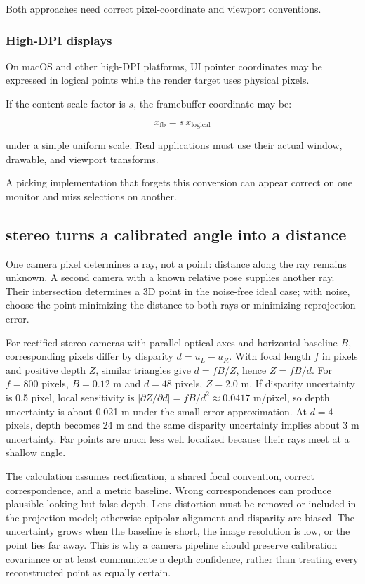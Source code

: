 Both approaches need correct pixel-coordinate and viewport conventions.

\subsubsection{High-DPI displays}\label{high-dpi-displays}

On macOS and other high-DPI platforms, UI pointer coordinates may be expressed in logical points while the render target uses physical pixels.

If the content scale factor is \(s\), the framebuffer coordinate may be:

\[ x_{\mathrm{fb}}=s\,x_{\mathrm{logical}} \]

under a simple uniform scale. Real applications must use their actual window, drawable, and viewport transforms.

A picking implementation that forgets this conversion can appear correct on one monitor and miss selections on another.

\subsection{stereo turns a calibrated angle into a distance}\label{stereo-turns-a-calibrated-angle-into-a-distance}

One camera pixel determines a ray, not a point: distance along the ray remains unknown. A second camera with a known relative pose supplies another ray. Their intersection determines a 3D point in the noise-free ideal case; with noise, choose the point minimizing the distance to both rays or minimizing reprojection error.

For rectified stereo cameras with parallel optical axes and horizontal baseline \(B\), corresponding pixels differ by disparity \(d=u_L-u_R\). With focal length \(f\) in pixels and positive depth \(Z\), similar triangles give \(d=fB/Z\), hence \(Z=fB/d\). For \(f=800\) pixels, \(B=0.12\) m and \(d=48\) pixels, \(Z=2.0\) m. If disparity uncertainty is 0.5 pixel, local sensitivity is \(|\partial Z/\partial d|=fB/d^2\approx0.0417\) m/pixel, so depth uncertainty is about 0.021 m under the small-error approximation. At \(d=4\) pixels, depth becomes 24 m and the same disparity uncertainty implies about 3 m uncertainty. Far points are much less well localized because their rays meet at a shallow angle.

The calculation assumes rectification, a shared focal convention, correct correspondence, and a metric baseline. Wrong correspondences can produce plausible-looking but false depth. Lens distortion must be removed or included in the projection model; otherwise epipolar alignment and disparity are biased. The uncertainty grows when the baseline is short, the image resolution is low, or the point lies far away. This is why a camera pipeline should preserve calibration covariance or at least communicate a depth confidence, rather than treating every reconstructed point as equally certain.

